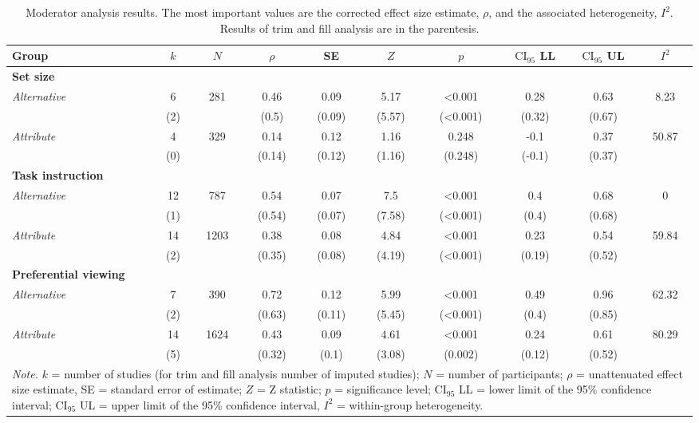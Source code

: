 \begin{table}[ht]
\centering
\caption{Moderator analysis results. The most important values are the corrected effect size estimate, $\rho$, and the associated heterogeneity, $I^2$. Results of trim and fill analysis are in the parentesis.} 
\label{tab:mod_results}
\begingroup\small
\begin{tabular}{lccccccccc}
  \hline
Group & $k$ & $N$ & $\rho$ & SE & $Z$ & $p$ & $\textrm{CI}_{95}$ LL & $\textrm{CI}_{95}$ UL & $I^2$ \\ 
  \hline
\textbf{Set size} &  &  &  &  &  &  &  &  &  \\ 
  \hspace{2mm}\textit{Alternative} & 6 & 281 & 0.46 & 0.09 & 5.17 & <0.001 & 0.28 & 0.63 & 8.23 \\ 
   & (2) &  & (0.5) & (0.09) & (5.57) & (<0.001) & (0.32) & (0.67) &  \\ 
  \hspace{2mm}\textit{Attribute} & 4 & 329 & 0.14 & 0.12 & 1.16 & 0.248 & -0.1 & 0.37 & 50.87 \\ 
   & (0) &  & (0.14) & (0.12) & (1.16) & (0.248) & (-0.1) & (0.37) &  \\ 
  \textbf{Task instruction} &  &  &  &  &  &  &  &  &  \\ 
  \hspace{2mm}\textit{Alternative} & 12 & 787 & 0.54 & 0.07 & 7.5 & <0.001 & 0.4 & 0.68 & 0 \\ 
   & (1) &  & (0.54) & (0.07) & (7.58) & (<0.001) & (0.4) & (0.68) &  \\ 
  \hspace{2mm}\textit{Attribute} & 14 & 1203 & 0.38 & 0.08 & 4.84 & <0.001 & 0.23 & 0.54 & 59.84 \\ 
   & (2) &  & (0.35) & (0.08) & (4.19) & (<0.001) & (0.19) & (0.52) &  \\ 
  \textbf{Preferential viewing} &  &  &  &  &  &  &  &  &  \\ 
  \hspace{2mm}\textit{Alternative} & 7 & 390 & 0.72 & 0.12 & 5.99 & <0.001 & 0.49 & 0.96 & 62.32 \\ 
   & (2) &  & (0.63) & (0.11) & (5.45) & (<0.001) & (0.4) & (0.85) &  \\ 
  \hspace{2mm}\textit{Attribute} & 14 & 1624 & 0.43 & 0.09 & 4.61 & <0.001 & 0.24 & 0.61 & 80.29 \\ 
   & (5) &  & (0.32) & (0.1) & (3.08) & (0.002) & (0.12) & (0.52) &  \\ 
   \hline 
 \multicolumn{10}{p{0.9\textwidth}}{\scriptsize{\textit{Note.} $k$ = number of studies (for trim and fill analysis number of imputed studies); $N$ = number of participants; $\rho$ = unattenuated effect size estimate, SE = standard error of estimate; $Z$ = Z statistic; $p$ = significance level; $\textrm{CI}_{95}$ LL = lower limit of the 95\% confidence interval; $\textrm{CI}_{95}$ UL = upper limit of the 95\% confidence interval, $I^2$ = within-group heterogeneity.}} 
\end{tabular}
\endgroup
\end{table}
